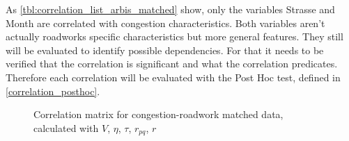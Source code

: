 As \cref{tbl:correlation_list_arbis_matched} show, only the variables Strasse and Month are correlated with congestion characteristics. Both variables aren't actually roadworks specific characteristics but more general features. They still will be evaluated to identify possible dependencies. For that it needs to be verified that the correlation is significant and what the correlation predicates. Therefore each correlation will be evaluated with the Post Hoc test, defined in \cref{correlation_posthoc}. 
\begin{figure}[!ht]
	\centering
	\caption{Correlation matrix for congestion-roadwork matched data, calculated with $V$, $\eta$, $\tau$, $r_{pq}$, $r$}
	\label{img:correlation_matrix_arbis_selected_effector_cramers}
\end{figure}


